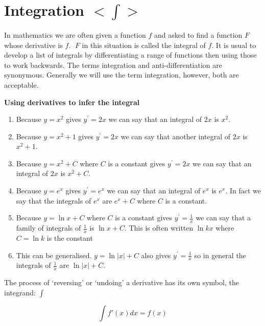 \chapter[Integration]{Integration $<\int>$}
In mathematics we are often given a function $f$ and asked to find a function $F$ whose derivative is $f$. $\;F$ in this situation is called the integral of $f$. It is usual to develop a list of integrals by differentiating a range of functions then using those to work backwards. The terms integration and anti-differentiation are synonymous. Generally we will use the term integration, however, both are acceptable.

\textbf{Using derivatives to infer the integral}
\begin{enumerate}
\item Because $y =x^{2}$ gives $y^{ \prime } =2 x$ we can say that an integral of $2 x$ is $x^{2}$. 

\item Because $y =x^{2} +1$ gives $y^{ \prime } =2 x$ we can say that another integral of $2 x$ is $x^{2} +1$. 

\item Because $y =x^{2} +C$ where $C$ is a constant gives $y^{ \prime } =2 x$ we can say that an integral of $2 x$ is $x^{2} +C$. 

\item Because $y =e^{x}$ gives $y^{ \prime } =e^{x}$ we can say that an integral of $e^{x}$ is $e^{x}$. In fact we say that the integrals of $e^{x}$ are $e^{x} +C$ where $C$ is a constant. 

\item Because $y =\ln  x +C$ where $C$ is a constant gives $y^{ \prime } =\frac{1}{x}$ we can say that a family of integrals of $\frac{1}{x}$ is $\ln  x +C$. This is often written $\ln  k x$ where $C =\ln  k$ is the constant 

\item This can be generalised. $y =\ln  \left \vert x\right \vert  +C$ also gives $y^{ \prime } =\frac{1}{x}$ so in general the integrals of $\frac{1}{x}$ are $\ln  \left \vert x\right \vert  +C$. \end{enumerate}

The process of `reversing' or `undoing' a derivative has its own symbol, the integrand: $\displaystyle\int$
\begin{tcolorbox}
	\[\int f'(x) dx = f(x)\]
\end{tcolorbox}

